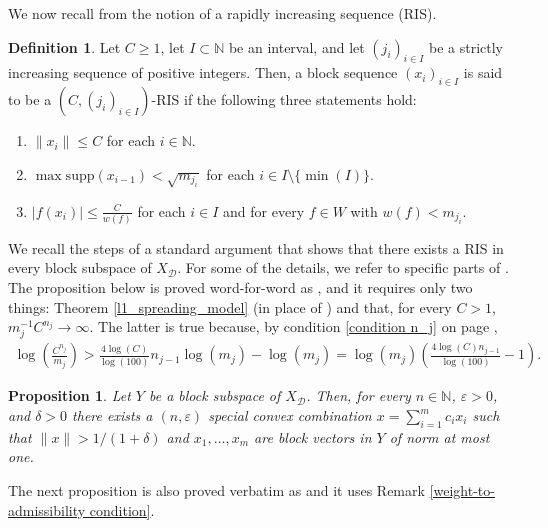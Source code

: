 \documentclass[12pt,a4paper]{amsart}
\newcommand{\N}{\mathbb{N}}
\newcommand{\supp}{\text{supp}}
\theoremstyle{definition}
\newtheorem{definition}[question]{Definition}
\theoremstyle{plain}
\newtheorem{proposition}[question]{Proposition}
\begin{document}
We now recall from \cite{argyros:motakis:2020} the notion of a rapidly increasing sequence (RIS).

\begin{definition}{\label{RIS}}
Let $C\geq 1$, let $I\subset\N$ be an interval, and let $(j_{i})_{i\in I}$ be a strictly increasing sequence of positive integers. Then, a block sequence $(x_{i})_{i\in I}$ is said to be a $(C,(j_{i})_{i\in I})$-RIS if the following three statements hold:
\begin{enumerate}
\item $\|x_{i}\|\leq C$ for each $i\in\N$.
\item $\max\supp(x_{i-1})<\sqrt{m_{j_{i}}}$ for each $i\in I\setminus\{\min(I)\}$.
\item $|f(x_{i})|\leq\frac{C}{w(f)}$ for each $i\in I$ and for every $f\in W$ with $w(f)<m_{j_{i}}$.
\end{enumerate}
\end{definition}

We recall the steps of a standard argument that shows that there exists a RIS in every block subspace of $X_\mathcal{D}$. For some of the details, we refer to specific parts of \cite{argyros:motakis:2020}. The proposition below is proved word-for-word as \cite[Proposition 6.3]{argyros:motakis:2020}, and it requires only two things: Theorem \ref{l1_spreading_model} (in place of \cite[Proposition 4.1]{argyros:motakis:2020}) and that, for every $C>1$, $m_j^{-1}C^{n_j}\to\infty$. The latter is true because, by condition \ref{condition n_j} on page \pageref{condition n_j},
\begin{align*} \log\left(\frac{C^{n_{j}}}{m_{j}}\right) >\frac{4\log(C)}{\log(100)}n_{j-1}\log(m_{j})-\log(m_{j})=\log(m_{j})\left(\frac{4\log(C)n_{j-1}}{\log(100)}-1\right). \end{align*}

\begin{proposition}
\label{scc existene in block subspace}
Let $Y$ be a block subspace of $X_\mathcal{D}$. Then, for every $n\in\mathbb{N}$, $\varepsilon>0$, and $\delta>0$ there exists a $(n,\varepsilon)$ special convex combination $x= \sum_{i=1}^mc_ix_i$ such that $\|x\| > 1/(1+\delta)$ and $x_1,\ldots,x_m$ are block vectors in $Y$ of norm at most one.
\end{proposition}




The next proposition is also proved verbatim as \cite[Proposition 6.4]{argyros:motakis:2020} and it uses Remark \ref{weight-to-admissibility condition}.
\end{document}
